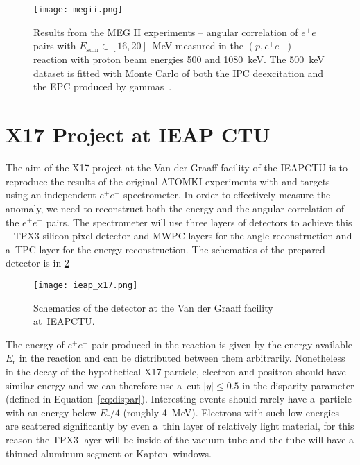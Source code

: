 				\begin{figure}
					\centering
					\texttt{[image: megii.png]}
					\caption{Results from the MEG II experiments -- angular correlation of $e^+e^-$ pairs with $E_\text{sum} \in [16,20]$~MeV measured in the $(p,e^+e^-)$ reaction with proton beam energies 500 and 1080~keV. The 500~keV dataset is fitted with Monte Carlo of both the \ac{IPC} deexcitation and the \ac{EPC} produced by gammas~\cite{megii}.}
					\label{fig:megii}
				\end{figure}
			
	
	\section{X17 Project at IEAP CTU}
	\label{sec:IEAP}
		The aim of the X17 project at the Van der Graaff facility of the \acl{IEAPCTU} is to reproduce the results of the original ATOMKI experiments with  and  targets using an independent $e^+e^-$ spectrometer. In order to effectively measure the anomaly, we need to reconstruct both the energy and the angular correlation of the $e^+e^-$ pairs. The spectrometer will use three layers of detectors to achieve this -- \acf{TPX3} silicon pixel detector and \acf{MWPC} layers for the angle reconstruction and a~\acf{TPC} layer for the energy reconstruction. The schematics of the prepared detector is in \cref{fig:ieap}
			
			\begin{figure}
				\centering
				\texttt{[image: ieap\_x17.png]}
				\caption{Schematics of the detector at the Van der Graaff facility at~\ac{IEAPCTU}.}
				\label{fig:ieap}
			\end{figure}
		
		The energy of $e^+e^-$ pair produced in the reaction is given by the energy available $E_\text{r}$ in the reaction and can be distributed between them arbitrarily. Nonetheless in the decay of the hypothetical X17 particle, electron and positron should have similar energy and we can therefore use a~cut $|y| \leq 0.5$ in the disparity parameter (defined in Equation~\ref{eq:dispar}). Interesting events should rarely have a~particle with an energy below $E_\text{r}/4$ (roughly 4~MeV). Electrons with such low energies are scattered significantly by even a~thin layer of relatively light material, for this reason the \ac{TPX3} layer will be inside of the vacuum tube and the tube will have a thinned aluminum segment or Kapton\texttrademark\ windows.
		
